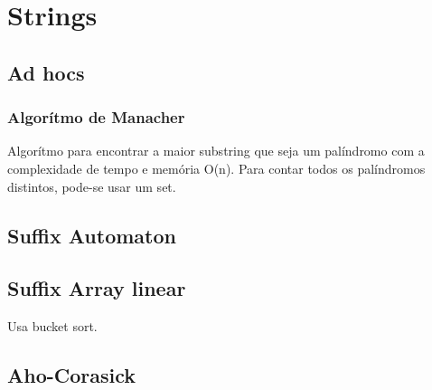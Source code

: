 \section{Strings}

\subsection{Ad hocs}
\subsubsection{Algorítmo de Manacher}
Algor\'{i}tmo para encontrar a maior substring que seja um pal\'{i}ndromo com a complexidade de tempo e mem\'{o}ria O(n).
Para contar todos os palíndromos distintos, pode-se usar um set.

\divisor
\subsection{Suffix Automaton}

\divisor

\subsection{Suffix Array linear}

Usa bucket sort.


\divisor

\subsection{Aho-Corasick}

